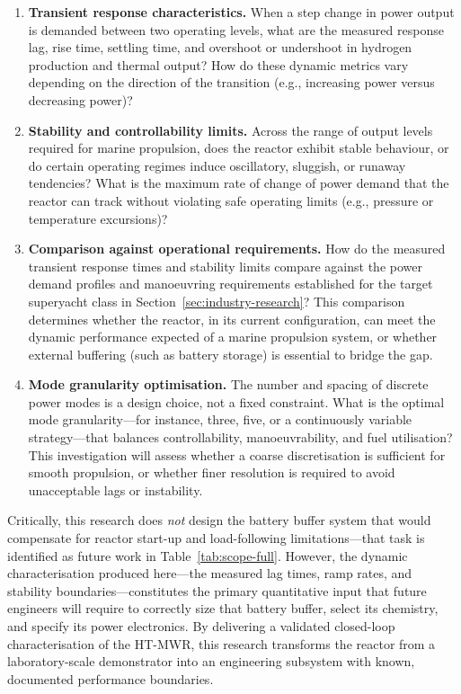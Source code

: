 \documentclass[12pt]{article}
\begin{document}
\begin{enumerate}
    \item \textbf{Transient response characteristics.} When a step change in power output is demanded between two operating levels, what are the measured response lag, rise time, settling time, and overshoot or undershoot in hydrogen production and thermal output? How do these dynamic metrics vary depending on the direction of the transition (e.g., increasing power versus decreasing power)?

    \item \textbf{Stability and controllability limits.} Across the range of output levels required for marine propulsion, does the reactor exhibit stable behaviour, or do certain operating regimes induce oscillatory, sluggish, or runaway tendencies? What is the maximum rate of change of power demand that the reactor can track without violating safe operating limits (e.g., pressure or temperature excursions)?

    \item \textbf{Comparison against operational requirements.} How do the measured transient response times and stability limits compare against the power demand profiles and manoeuvring requirements established for the target superyacht class in Section~\ref{sec:industry-research}? This comparison determines whether the reactor, in its current configuration, can meet the dynamic performance expected of a marine propulsion system, or whether external buffering (such as battery storage) is essential to bridge the gap.

    \item \textbf{Mode granularity optimisation.} The number and spacing of discrete power modes is a design choice, not a fixed constraint. What is the optimal mode granularity---for instance, three, five, or a continuously variable strategy---that balances controllability, manoeuvrability, and fuel utilisation? This investigation will assess whether a coarse discretisation is sufficient for smooth propulsion, or whether finer resolution is required to avoid unacceptable lags or instability.
\end{enumerate}

Critically, this research does \emph{not} design the battery buffer system that would compensate for reactor start-up and load-following limitations---that task is identified as future work in Table~\ref{tab:scope-full}. However, the dynamic characterisation produced here---the measured lag times, ramp rates, and stability boundaries---constitutes the primary quantitative input that future engineers will require to correctly size that battery buffer, select its chemistry, and specify its power electronics. By delivering a validated closed-loop characterisation of the HT-MWR, this research transforms the reactor from a laboratory-scale demonstrator into an engineering subsystem with known, documented performance boundaries.
\end{document}
